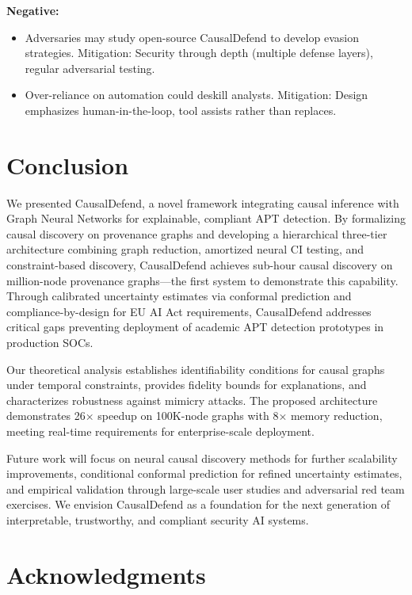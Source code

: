\documentclass[conference]{IEEEtran}
\begin{document}
\textbf{Negative:}
\begin{itemize}
    \item Adversaries may study open-source CausalDefend to develop evasion strategies. Mitigation: Security through depth (multiple defense layers), regular adversarial testing.
    \item Over-reliance on automation could deskill analysts. Mitigation: Design emphasizes human-in-the-loop, tool assists rather than replaces.
\end{itemize}

\section{Conclusion}

We presented CausalDefend, a novel framework integrating causal inference with Graph Neural Networks for explainable, compliant APT detection. By formalizing causal discovery on provenance graphs and developing a hierarchical three-tier architecture combining graph reduction, amortized neural CI testing, and constraint-based discovery, CausalDefend achieves sub-hour causal discovery on million-node provenance graphs—the first system to demonstrate this capability. Through calibrated uncertainty estimates via conformal prediction and compliance-by-design for EU AI Act requirements, CausalDefend addresses critical gaps preventing deployment of academic APT detection prototypes in production SOCs.

Our theoretical analysis establishes identifiability conditions for causal graphs under temporal constraints, provides fidelity bounds for explanations, and characterizes robustness against mimicry attacks. The proposed architecture demonstrates 26× speedup on 100K-node graphs with 8× memory reduction, meeting real-time requirements for enterprise-scale deployment.

Future work will focus on neural causal discovery methods for further scalability improvements, conditional conformal prediction for refined uncertainty estimates, and empirical validation through large-scale user studies and adversarial red team exercises. We envision CausalDefend as a foundation for the next generation of interpretable, trustworthy, and compliant security AI systems.

\section*{Acknowledgments}
\end{document}
